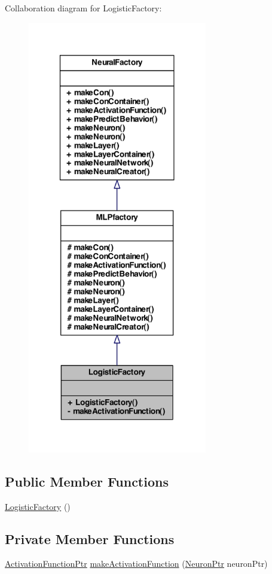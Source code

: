 Collaboration diagram for LogisticFactory:\nopagebreak
\begin{figure}[H]
\begin{center}
\leavevmode
\includegraphics[width=222pt]{class_logistic_factory__coll__graph}
\end{center}
\end{figure}
\subsection*{Public Member Functions}
\begin{DoxyCompactItemize}
\item 
\hyperlink{class_logistic_factory_a65649392e9c0bd18799d88bbc69fcdb0}{LogisticFactory} ()
\end{DoxyCompactItemize}
\subsection*{Private Member Functions}
\begin{DoxyCompactItemize}
\item 
\hyperlink{_a_m_o_r_e_8h_a77602a0277a02e5769c3df0adc669b17}{ActivationFunctionPtr} \hyperlink{class_logistic_factory_a43d3c7497e5f4058f514f86cfd25d9f8}{makeActivationFunction} (\hyperlink{_a_m_o_r_e_8h_ac1ea936c2c7728eb382278131652fef4}{NeuronPtr} neuronPtr)
\end{DoxyCompactItemize}



